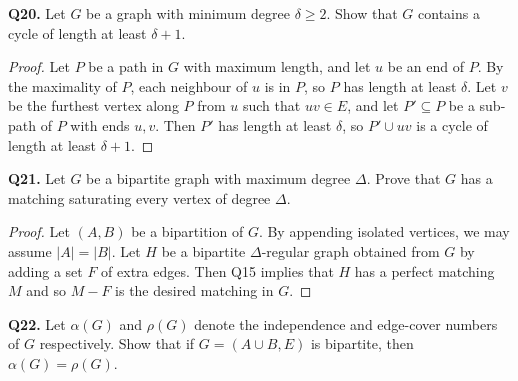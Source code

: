\noindent \textbf{Q20.} Let \( G \) be a graph with minimum degree \( \delta \geq 2 \). Show that \( G \) contains a cycle of length at least \( \delta + 1 \).
\begin{proof}
Let \( P \) be a path in \( G \) with maximum length, and let \( u \) be an end of \( P \). By the maximality of \( P \), each neighbour of \( u \) is in \( P \), so \( P \) has length at least \( \delta \). Let \( v \) be the furthest vertex along \( P \) from \( u \) such that \( uv \in E \), and let \( P' \subseteq P \) be a sub-path of \( P \) with ends \( u,v \). Then \( P' \) has length at least \( \delta \), so \( P' \cup uv \) is a cycle of length at least \( \delta + 1 \).
\end{proof}
\noindent \textbf{Q21.} Let \( G \) be a bipartite graph with maximum degree \( \Delta \). Prove that \( G \) has a matching saturating every vertex of degree \( \Delta \).
\begin{proof}
Let \( (A,B) \) be a bipartition of \( G \). By appending isolated vertices, we may assume \( |A| = |B| \). Let \( H \) be a bipartite \( \Delta \)-regular graph obtained from \( G \) by adding a set \( F \) of extra edges. Then Q15 implies that \( H \) has a perfect matching \( M \) and so \( M - F \) is the desired matching in \( G \).
\end{proof}
\noindent \textbf{Q22.} Let \( \alpha (G) \) and \( \rho (G) \) denote the independence and edge-cover numbers of \( G \) respectively. Show that if \( G = ( A \cup B, E) \) is bipartite, then \( \alpha(G) = \rho (G) \).
